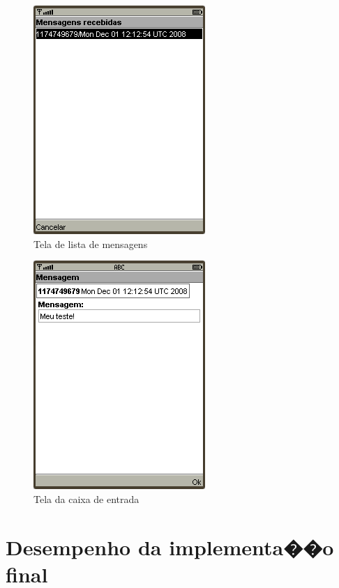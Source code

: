 \documentclass[a4paper,capchap,espacoduplo,normaltoc]{abntepusp}
\begin{document}
\begin{figure}[h]
	\centering
		\includegraphics{figuras/telalistamensagens.PNG}
	\caption{Tela de lista de mensagens}
\end{figure}

\begin{figure}[h]
	\centering
		\includegraphics{figuras/telalermensagem.PNG}
	\caption{Tela da caixa de entrada}
\end{figure}

\chapter{Desempenho da implementa��o final}\label{app:desempenho}
\end{document}
